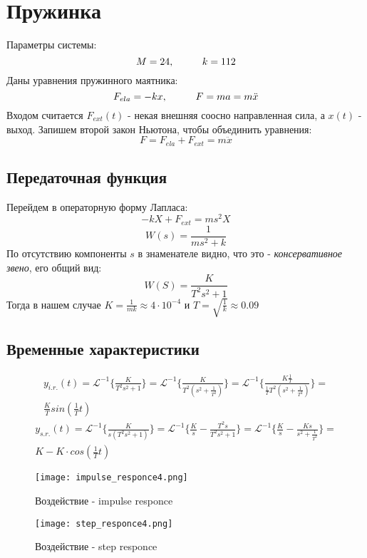\chapter{Пружинка}
\label{ch:chap4}
Параметры системы:
$$
M = 24, \hspace*{1cm} k = 112
$$
Даны уравнения пружинного маятника:
$$
F_{ela} = -kx, \hspace*{1cm} F = ma = m\ddot{x}
$$
Входом считается $F_{ext}(t)$ - некая внешняя соосно направленная сила, а $x(t)$ - выход. 
Запишем второй закон Ньютона, чтобы объединить уравнения:
$$
    F = F_{ela} + F_{ext} = m\ddot{x}
$$

\section{Передаточная функция}
Перейдем в операторную форму Лапласа:
$$
 -kX + F_{ext} = ms^2X
$$
$$
W(s) = \frac{1}{ms^2 + k}
$$
По отсутствию компоненты $s$ в знаменателе видно, что это - \textit{консервативное звено}, его общий вид:
$$
W(S) = \frac{K}{T^2s^2 + 1}
$$ Тогда в нашем случае $K = \frac{1}{mk} \approx 4\cdot 10^{-4}$ и $T = \sqrt{\frac{1}{k}} \approx 0.09$
\section{Временные  характеристики}
$$
\begin{aligned}
    y_{i.r.}(t) = \mathcal{L}^{-1}\{\frac{K}{T^2s^2 + 1}\} = \mathcal{L}^{-1}\{\frac{K}{T^2(s^2 + \frac{1}{T^2})}\} = \mathcal{L}^{-1}\{\frac{K \frac{1}{T}}{\frac{1}{T}T^2(s^2 + \frac{1}{T^2})}\} = \\
    \frac{K}{T} sin(\frac{1}{T}t)
\end{aligned}
$$
$$
    \begin{aligned}
        y_{s.r.}(t) = \mathcal{L}^{-1}\{\frac{K}{s(T^2s^2 + 1)}\} = \mathcal{L}^{-1}\{\frac{K}{s} - \frac{T^2s}{T^2s^2 + 1}\} = \mathcal{L}^{-1}\{\frac{K}{s} - \frac{Ks}{s^2 + \frac{1}{T^2}}\} = \\
        K - K\cdot cos(\frac{1}{T}t)
    \end{aligned}
$$
\newpage
\begin{figure}[ht]
  \centering
  \texttt{[image: impulse\_responce4.png]}
  \caption{Воздействие - \textrm{impulse responce}}
\end{figure}

\begin{figure}[ht]
    \centering
    \texttt{[image: step\_responce4.png]}
    \caption{Воздействие - \textrm{step responce}}
  \end{figure}
\newpage

